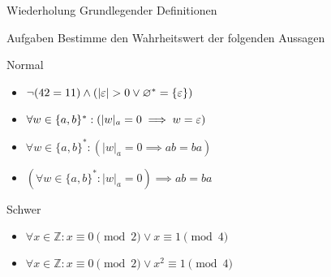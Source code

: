 
{
\begin{frame}[fragile]{Wiederholung Grundlegender Definitionen}
    \begin{alertblock}{Aufgaben}
        Bestimme den Wahrheitswert der folgenden Aussagen
    \end{alertblock}
    \begin{block}{Normal}
        \begin{itemize}
            \item $\neg (42 = 11) \wedge (|\varepsilon| > 0 \vee \varnothing^* = \{\varepsilon\})$
            \item $\forall w \in \{a, b\}^*: (|w|_a = 0 \implies w = \varepsilon)$
            \item $\forall w \in \{a, b\}^*: (|w|_a = 0 \implies ab = ba)$
            \item $(\forall w \in \{a, b\}^*: |w|_a = 0) \implies ab = ba$
        \end{itemize}
    \end{block}
    \begin{block}{Schwer}
        \begin{itemize}
            \item $\forall x \in \mathbb{Z}: x \equiv 0 \pmod{2} \vee x \equiv 1 \pmod{4}$
            \item $\forall x \in \mathbb{Z}: x \equiv 0 \pmod{2} \vee x^2 \equiv 1 \pmod{4}$
        \end{itemize}
    \end{block}
\end{frame}
}

